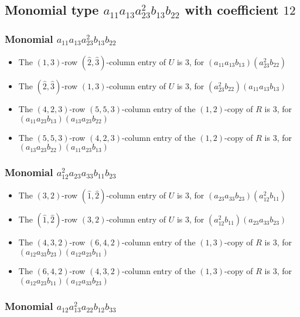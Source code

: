 \documentclass{article}
\begin{document}
\subsection{Monomial type $ a_{11} a_{13} a_{23}^{2} b_{13} b_{22} $ with coefficient $ 12 $}

\subsubsection{Monomial $ a_{11} a_{13} a_{23}^{2} b_{13} b_{22} $}

\begin{itemize}
\item The $ \left(1, 3\right) $-row $ (\hat{2}, \hat{3}) $-column entry of $U$ is $ 3 $, for $( a_{11} a_{13} b_{13} )( a_{23}^{2} b_{22} )$ 
\item The $(\hat{2}, \hat{3})$-row $ \left(1, 3\right) $-column entry of $U$ is $ 3 $, for $( a_{23}^{2} b_{22} )( a_{11} a_{13} b_{13} )$ 
\item The $(4, 2, 3)$-row $(5, 5, 3)$-column entry of the $ \left(1, 2\right) $-copy of $R$ is $ 3 $, for $( a_{11} a_{23} b_{13} )( a_{13} a_{23} b_{22} )$ 
\item The $(5, 5, 3)$-row $(4, 2, 3)$-column entry of the $ \left(1, 2\right) $-copy of $R$ is $ 3 $, for $( a_{13} a_{23} b_{22} )( a_{11} a_{23} b_{13} )$ 
\end{itemize}
\subsubsection{Monomial $ a_{12}^{2} a_{23} a_{33} b_{11} b_{23} $}

\begin{itemize}
\item The $ \left(3, 2\right) $-row $ (\hat{1}, \hat{2}) $-column entry of $U$ is $ 3 $, for $( a_{23} a_{33} b_{23} )( a_{12}^{2} b_{11} )$ 
\item The $(\hat{1}, \hat{2})$-row $ \left(3, 2\right) $-column entry of $U$ is $ 3 $, for $( a_{12}^{2} b_{11} )( a_{23} a_{33} b_{23} )$ 
\item The $(4, 3, 2)$-row $(6, 4, 2)$-column entry of the $ \left(1, 3\right) $-copy of $R$ is $ 3 $, for $( a_{12} a_{33} b_{23} )( a_{12} a_{23} b_{11} )$ 
\item The $(6, 4, 2)$-row $(4, 3, 2)$-column entry of the $ \left(1, 3\right) $-copy of $R$ is $ 3 $, for $( a_{12} a_{23} b_{11} )( a_{12} a_{33} b_{23} )$ 
\end{itemize}
\subsubsection{Monomial $ a_{12} a_{13}^{2} a_{22} b_{12} b_{33} $}
\end{document}
